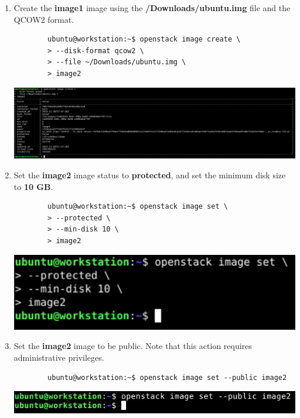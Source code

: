 \documentclass[letterpaper, 12pt]{article}
\begin{document}
\begin{enumerate}
    \item Create the \textbf{image1} image using the \textbf{\texttildemid/Downloads/ubuntu.img} file and the QCOW2
    format.
    \begin{lstlisting}
        ubuntu@workstation:~$ openstack image create \
        > --disk-format qcow2 \
        > --file ~/Downloads/ubuntu.img \
        > image2
    \end{lstlisting}

    \begin{center}
        \includegraphics[width=\linewidth]{images/part1/step14.png}
    \end{center}

    \item Set the \textbf{image2} image status to \textbf{protected}, and set the minimum disk size to \textbf{10 GB}.
    \begin{lstlisting}
        ubuntu@workstation:~$ openstack image set \
        > --protected \
        > --min-disk 10 \
        > image2
    \end{lstlisting}

    \begin{center}
        \includegraphics[width=\linewidth]{images/part1/step15.png}
    \end{center}

    \item Set the \textbf{image2} image to be public. Note that this action requires administrative privileges.
    \begin{lstlisting}
        ubuntu@workstation:~$ openstack image set --public image2
    \end{lstlisting}

    \begin{center}
        \includegraphics[width=\linewidth]{images/part1/step16.png}
    \end{center}


\end{enumerate}
\end{document}
